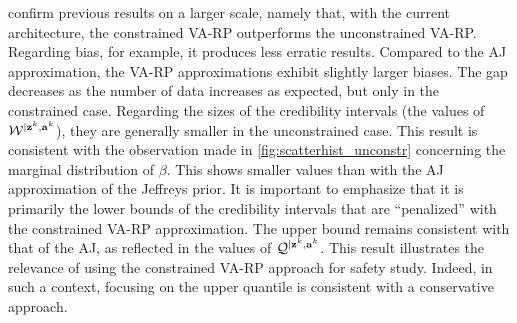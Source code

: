  confirm previous results on a larger scale, namely that, with the current architecture, the constrained VA-RP outperforms the unconstrained VA-RP. Regarding bias, for example, it produces less erratic results. Compared to the AJ approximation, the VA-RP approximations exhibit slightly larger biases. The gap decreases as the number of data increases as expected, but only in the constrained case. Regarding the sizes of the credibility intervals (the values of $\mathcal{W}^{|\mathbf{z}^k,\mathbf{a}^k}$), they are generally smaller in the unconstrained case. This result is consistent with the observation made in \cref{fig:scatterhist_unconstr} concerning the marginal distribution of $\beta$. This shows smaller values than with the AJ approximation of the Jeffreys prior.
It is important to emphasize that it is primarily the lower bounds of the credibility intervals that are ``penalized'' with the constrained VA-RP approximation. The upper bound remains consistent with that of the AJ, as reflected in the values of $\mathcal{Q}^{|\mathbf{z}^k,\mathbf{a}^k}$. This result illustrates the relevance of using the constrained VA-RP approach for safety study. Indeed, in such a context, focusing on the upper quantile is consistent with a conservative approach.







